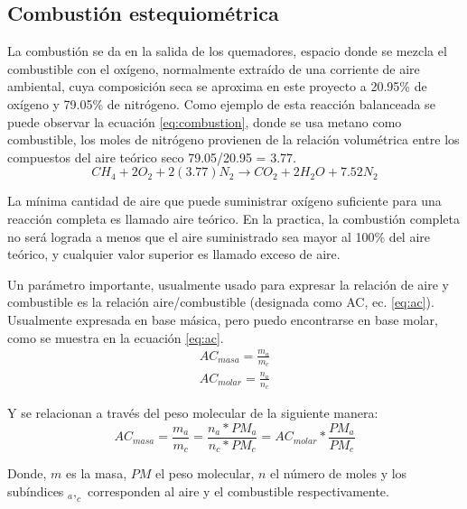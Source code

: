 \subsection{Combustión estequiométrica}
\par La combustión se da en la salida de los quemadores, espacio donde se mezcla el combustible con el oxígeno, normalmente extraído de una corriente de aire ambiental, cuya composición seca se aproxima en este proyecto a 20.95\% de oxígeno y 79.05\% de nitrógeno. Como ejemplo de esta reacción balanceada se puede observar la ecuación \ref{eq:combustion}, donde se usa metano como combustible, los moles de nitrógeno provienen de la relación volumétrica entre los compuestos del aire teórico seco 79.05/20.95 = 3.77.
\begin{equation}
    \label{eq:combustion}
    CH_4 + 2O_2 + 2(3.77)N_2 \rightarrow CO_2 + 2H_2O + 7.52N_2
\end{equation}
\par La mínima cantidad de aire que puede suministrar oxígeno suficiente para una reacción completa es llamado aire teórico. En la practica, la combustión completa no será lograda a menos que el aire suministrado sea mayor al 100\% del aire teórico, y cualquier valor superior es llamado exceso de aire.
\par Un parámetro importante, usualmente usado para expresar la relación de aire y combustible es la relación aire/combustible (designada como AC, ec. \ref{eq:ac}). Usualmente expresada en base másica, pero puedo encontrarse en base molar, como se muestra en la ecuación \ref{eq:ac}.
\begin{gather}
\label{eq:ac}
    AC_{masa} = \frac{m_{a}}{m_{c}}\\
    AC_{molar} = \frac{n_{a}}{n_{c}}
\end{gather}
\par Y se relacionan a través del peso molecular de la siguiente manera:
\begin{equation}
\label{eq:ac_rel}
    AC_{masa} = \frac{m_{a}}{m_{c}} =
    \frac{n_{a}*PM_{a}}{n_{c}*PM_{c}} = AC_{molar}*\frac{PM_{a}}{PM_{c}}
\end{equation}
\par Donde, $m$ es la masa, $PM$ el peso molecular, $n$ el número de moles y los subíndices $_a,_c$ corresponden al aire y el combustible respectivamente.

